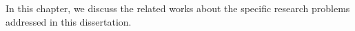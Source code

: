 In this chapter, we discuss the related works about the specific research problems addressed in this dissertation. 